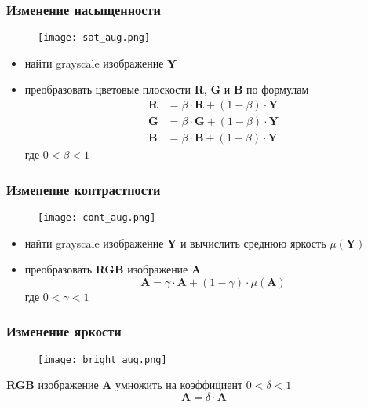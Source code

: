 \documentclass[
    12pt, 
    usepdftitle=false,
    aspectratio=1610
]{beamer}
\begin{document}
\begin{frame}
\frametitle{Изменение насыщенности}
\begin{figure}
    \centering
    \texttt{[image: sat\_aug.png]}
\end{figure}
\begin{itemize}
    \item найти grayscale изображение $\mathbf{Y}$
    \item преобразовать цветовые плоскости \textbf{R}, \textbf{G} и \textbf{B} по формулам
    \begin{align*}
      \mathbf{R} &= \beta \cdot \mathbf{R} + (1-\beta)\cdot\mathbf{Y}\\
      \mathbf{G} &= \beta \cdot \mathbf{G} + (1-\beta)\cdot\mathbf{Y}\\
      \mathbf{B} &= \beta \cdot \mathbf{B} + (1-\beta)\cdot\mathbf{Y}
    \end{align*}
  где $0 < \beta < 1$
\end{itemize}
\end{frame}

\begin{frame}
\frametitle{Изменение контрастности}
\begin{figure}
    \centering
    \texttt{[image: cont\_aug.png]}
\end{figure}
\begin{itemize}
    \item найти grayscale изображение $\mathbf{Y}$ и вычислить среднюю яркость $\mu\left(\mathbf{Y}\right)$
    \item преобразовать \textbf{RGB} изображение \textbf{A}
    $$
      \mathbf{A} = \gamma \cdot \mathbf{A} + (1-\gamma)\cdot\mu\left(\mathbf{A}\right)
    $$
  где $0 < \gamma < 1$
\end{itemize}
\end{frame}

\begin{frame}
\frametitle{Изменение яркости}
\begin{figure}
    \centering
    \texttt{[image: bright\_aug.png]}
\end{figure}
    \textbf{RGB} изображение \textbf{A} умножить на коэффициент $0 < \delta < 1$
    $$
        \mathbf{A} = \delta \cdot \mathbf{A}
    $$
\end{frame}
\end{document}
